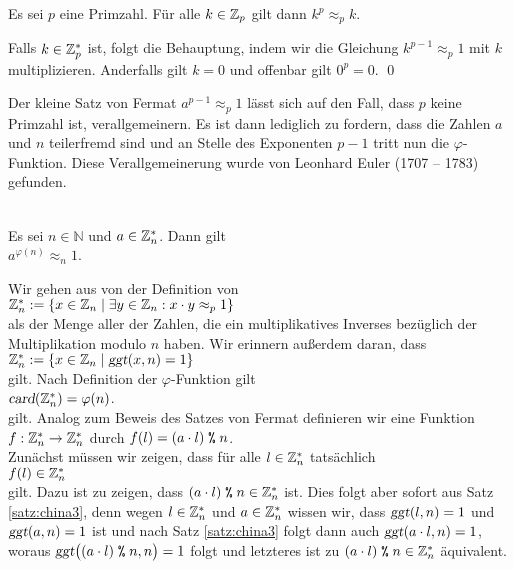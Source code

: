 \begin{Korollar}
  Es sei $p$ eine Primzahl.  Für alle $k \in \mathbb{Z}_{p}$ gilt dann $k^p \approx_p k$.
\end{Korollar}

\proof
Falls $k \in \mathbb{Z}_{p}^*$ ist, folgt die Behauptung, indem wir die Gleichung $k^{p-1} \approx_p 1$
mit $k$ multiplizieren.  Anderfalls gilt $k= 0$ und offenbar gilt $0^p = 0$. \qed
\vspace*{0.3cm}

Der kleine Satz von Fermat $a^{p-1} \approx_p 1$ lässt sich auf den Fall, dass $p$ keine Primzahl ist,
verallgemeinern.  Es ist dann lediglich zu fordern, dass die Zahlen $a$ und $n$ teilerfremd sind und an
Stelle des Exponenten $p - 1$ tritt nun die $\varphi$-Funktion.   Diese Verallgemeinerung wurde von Leonhard
Euler (1707 -- 1783) gefunden.


\begin{Satz} \hspace*{\fill} \\ 
Es sei $n \in \mathbb{N}$ und  $a \in \mathbb{Z}_{n}^*$. Dann gilt
\\[0.2cm]
\hspace*{1.3cm}
$a^{\varphi(n)} \approx_n 1$.  
\end{Satz}

\proof
Wir gehen aus von der Definition von
\\[0.2cm]
\hspace*{1.3cm}
$\mathbb{Z}_{n}^* := \{ x \in \mathbb{Z}_{n} \mid \exists y \in \mathbb{Z}_{n} : x \cdot y \approx_p 1 \}$
\\[0.2cm]
als der Menge aller der Zahlen, die ein multiplikatives Inverses bezüglich der Multiplikation modulo $n$
haben.  Wir erinnern außerdem daran, dass
\\[0.2cm]
\hspace*{1.3cm}
$\mathbb{Z}_{n}^* := \{ x \in \mathbb{Z}_{n} \mid \textsl{ggt}(x, n) = 1 \}$
\\[0.2cm]
gilt.  Nach Definition der $\varphi$-Funktion gilt
\\[0.2cm]
\hspace*{1.3cm}
$\textsl{card}(\mathbb{Z}_{n}^*) = \varphi(n)$.
\\[0.2cm]
gilt.  Analog zum Beweis des Satzes von Fermat definieren wir eine Funktion
\\[0.2cm]
\hspace*{1.3cm}
$f: \mathbb{Z}_{n}^* \rightarrow \mathbb{Z}_{n}^*$ \quad durch \quad $f(l) = (a \cdot l) \;\texttt{\%}\; n$.
\\[0.2cm]
Zunächst müssen wir zeigen, dass für alle $l \in \mathbb{Z}_{n}^*$ tatsächlich 
\\[0.2cm]
\hspace*{1.3cm}
$f(l) \in \mathbb{Z}_{n}^*$
\\[0.2cm]
gilt.  Dazu ist zu zeigen, dass $(a \cdot l) \;\texttt{\%}\; n \in \mathbb{Z}_{n}^*$ ist.  
Dies folgt aber sofort aus Satz \ref{satz:china3}, denn
wegen $l \in \mathbb{Z}_{n}^*$ und $a \in \mathbb{Z}_{n}^*$ wissen wir, dass $\textsl{ggt}(l,n) = 1$ und
$\textsl{ggt}(a,n) = 1$ ist und nach Satz \ref{satz:china3} folgt dann auch 
$\textsl{ggt}(a \cdot l, n) = 1$, woraus $\textsl{ggt}\bigl((a \cdot l) \;\texttt{\%}\; n, n\bigr) = 1$
folgt und letzteres ist zu $(a \cdot l) \;\texttt{\%}\; n \in \mathbb{Z}_{n}^*$ äquivalent.


